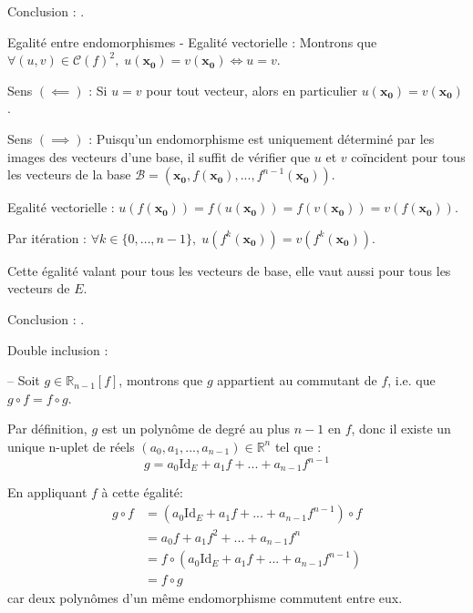 \documentclass[10pt,a4paper]{article}
\begin{document}
Conclusion : .

\q Egalité entre endomorphismes - Egalité vectorielle : Montrons que  \(\forall (u, v) \in \mathcal{C}(f)^2, \; u(\mathbf{x_0}) = v(\mathbf{x_0}) \iff u =
v\).

Sens \((\impliedby)\) : Si \(u = v\) pour tout vecteur, alors en particulier \(u(\mathbf{x_0}) =
v(\mathbf{x_0})\).

Sens \((\implies)\) : Puisqu'un endomorphisme est uniquement déterminé par les images des vecteurs
d'une base, il suffit de vérifier que \(u\) et \(v\) coïncident pour tous les vecteurs de la base
\(\mathcal{B} = (\mathbf{x_0}, f(\mathbf{x_0}), ..., f^{n-1}(\mathbf{x_0}))\).

Egalité vectorielle : \(u(f(\mathbf{x_0})) = f(u(\mathbf{x_0})) = f(v(\mathbf{x_0})) =
v(f(\mathbf{x_0}))\).

Par itération : \(\forall k \in \{ 0, \dots, n-1 \}, \; u(f^k(\mathbf{x_0})) = v(f^k(\mathbf{x_0}))\).

Cette égalité valant pour tous les vecteurs de base, elle vaut aussi pour tous les vecteurs de
\(E\).

Conclusion : .

\q Double inclusion :

 -- Soit \(g \in \mathbb{R}_{n-1}[f]\),
montrons que  $g$ appartient au commutant de $f$, i.e. que $g \circ f = f \circ
g$.

Par définition, \(g\) est un polynôme de degré au plus \(n-1\) en \(f\), donc il existe un unique
n-uplet de réels \((a_0, a_1, ..., a_{n-1}) \in \mathbb{R}^n\) tel que :
\[
g = a_0 \mathrm{Id}_E + a_1 f + ... + a_{n-1} f^{n-1}
\]

En appliquant \(f\) à cette égalité:
\[
\begin{aligned}
g \circ f & = (a_0 \mathrm{Id}_E + a_1 f + ... + a_{n-1} f^{n-1}) \circ f\\
& = a_0 f + a_1 f^2 + ... + a_{n-1} f^n\\
& = f \circ (a_0 \mathrm{Id}_E + a_1 f + ... + a_{n-1} f^{n-1})\\
& = f \circ g
\end{aligned}
\]
car deux polynômes d'un même endomorphisme commutent entre eux.
\end{document}
